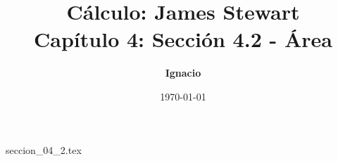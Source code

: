 \documentclass[11pt,spanish,oneside]{report}
\title{\textbf{Cálculo: James Stewart} \\ \Large Capítulo 4: Sección 4.2 - Área}
\author{\textbf{Ignacio}}
\date{\today}
\begin{document}
\maketitle

{seccion_04_2.tex}
\end{document}

